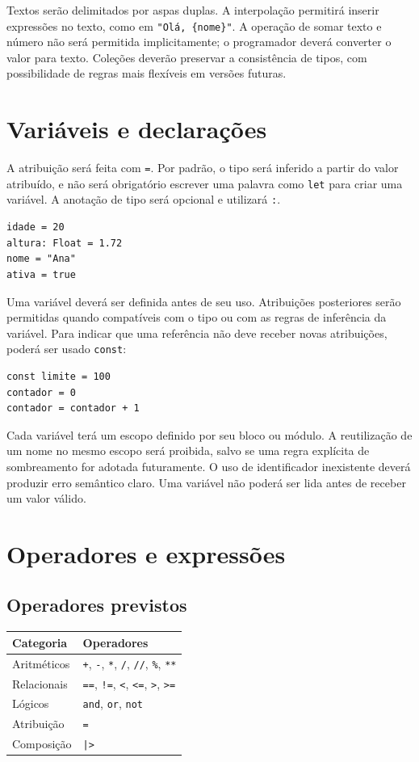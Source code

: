 \documentclass[12pt,a4paper]{article}
\begin{document}
Textos serão delimitados por aspas duplas. A interpolação permitirá inserir expressões no texto, como em \texttt{"Olá, \{nome\}"}. A operação de somar texto e número não será permitida implicitamente; o programador deverá converter o valor para texto. Coleções deverão preservar a consistência de tipos, com possibilidade de regras mais flexíveis em versões futuras.

\section{Variáveis e declarações}
A atribuição será feita com \texttt{=}. Por padrão, o tipo será inferido a partir do valor atribuído, e não será obrigatório escrever uma palavra como \texttt{let} para criar uma variável. A anotação de tipo será opcional e utilizará \texttt{:}.

\begin{lstlisting}
idade = 20
altura: Float = 1.72
nome = "Ana"
ativa = true
\end{lstlisting}

Uma variável deverá ser definida antes de seu uso. Atribuições posteriores serão permitidas quando compatíveis com o tipo ou com as regras de inferência da variável. Para indicar que uma referência não deve receber novas atribuições, poderá ser usado \texttt{const}:

\begin{lstlisting}
const limite = 100
contador = 0
contador = contador + 1
\end{lstlisting}

Cada variável terá um escopo definido por seu bloco ou módulo. A reutilização de um nome no mesmo escopo será proibida, salvo se uma regra explícita de sombreamento for adotada futuramente. O uso de identificador inexistente deverá produzir erro semântico claro. Uma variável não poderá ser lida antes de receber um valor válido.

\section{Operadores e expressões}
\subsection{Operadores previstos}
\begin{center}
\begin{tabular}{ll}
\textbf{Categoria} & \textbf{Operadores}\\
\hline
Aritméticos & \texttt{+}, \texttt{-}, \texttt{*}, \texttt{/}, \texttt{//}, \texttt{\%}, \texttt{**}\\
Relacionais & \texttt{==}, \texttt{!=}, \texttt{<}, \texttt{<=}, \texttt{>}, \texttt{>=}\\
Lógicos & \texttt{and}, \texttt{or}, \texttt{not}\\
Atribuição & \texttt{=}\\
Composição & \texttt{|>}\\
\end{tabular}
\end{center}
\end{document}
